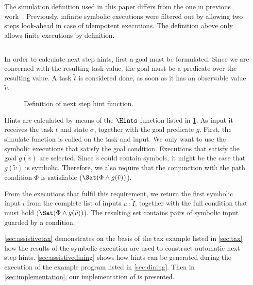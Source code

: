 The simulation definition used in this paper differs from the one in previous work~\cite{Naus2019}.
Previously, infinite symbolic executions were filtered out by allowing two steps look-ahead in case of idempotent executions.
The definition above only allows finite executions by definition.




\subsection{}


In order to calculate next step hints, first a goal must be formulated.
Since we are concerned with the resulting task value, the goal must be a predicate over the resulting value.
A task $\tilde{t}$ is considered done, as soon as it has an observable value $\tilde{v}$.

\begin{figure}
  \caption{Definition of next step hint function.}
  \label{fig:hints}
\end{figure}


Hints are calculated by means of the $\Hints$ function listed in \cref{fig:hints}.
As input it receives the task $t$ and state $\sigma$, together with the goal predicate $g$.
First, the simulate function is called on the task and input.
We only want to use the symbolic executions that satisfy the goal condition.
Executions that satisfy the goal $g(\tilde{v})$ are selected.
Since $\tilde{v}$ could contain symbols, it might be the case that $g(\tilde{v})$ is symbolic.
Therefore, we also require that the conjunction with the path condition $\Phi$ is satisfiable ($\Sat(\Phi\land g(\tilde{v}))$).

From the executions that fulfil this requirement, we return the first symbolic input $\tilde{i}$ from the complete list of inputs $\tilde{i}::\tilde{I}$,
together with the full condition that must hold ($\Sat(\Phi\land g(\tilde{v}))$).
The resulting set contains pairs of symbolic input guarded by a condition.

\cref{sec:assistivetax} demonstrates on the basis of the tax example listed in \cref{sec:tax} how the results of the symbolic execution are used to construct automatic next step hints.
\cref{sec:assistivedining} shows how hints can be generated during the execution of the example \TOPHAT program listed in \cref{sec:dining}.
Then in \cref{sec:implementation}, our implementation of \ASTOPHAT is presented.


